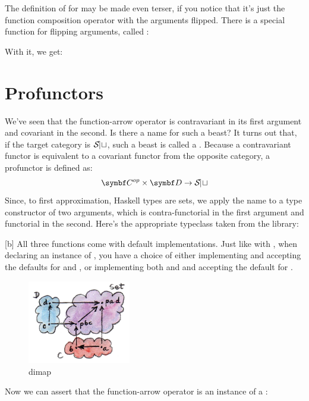 The definition of  for  may be made even
terser, if you notice that it's just the function composition operator
with the arguments flipped. There is a special function for flipping
arguments, called :

With it, we get:


\section{Profunctors}

We've seen that the function-arrow operator is contravariant in its
first argument and covariant in the second. Is there a name for such a
beast? It turns out that, if the target category is $\mathcal{S\mkern-3mu et}$, such a
beast is called a . Because a contravariant functor is
equivalent to a covariant functor from the opposite category, a
profunctor is defined as:
\[\cat{C}^{op} \times \cat{D} \to \Set\]
Since, to first approximation, Haskell types are sets, we apply the name
 to a type constructor  of two arguments,
which is contra-functorial in the first argument and functorial in the
second. Here's the appropriate typeclass taken from the
 library:

[b]
All three functions come with default implementations. Just like with
, when declaring an instance of ,
you have a choice of either implementing  and accepting
the defaults for  and , or implementing both
 and  and accepting the default for
.

\begin{figure}[H]
\centering
\includegraphics[width=0.4\textwidth]{images/dimap.jpg}
\caption{dimap}
\end{figure}

\noindent
Now we can assert that the function-arrow operator is an instance of a
:

